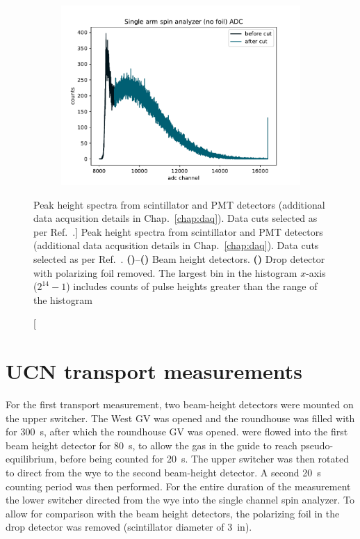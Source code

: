 \begin{figure}
\begin{subfigure}{.5\textwidth}
  \includegraphics[width=\textwidth]{figures/2021_single_arm_no_foil_adc.pdf}
  \caption{}\label{subfig:single_arm_no_foil_adc}
\end{subfigure}
\caption
[Peak height spectra from \BZnS scintillator and PMT detectors (additional data acqusition details in Chap.~\ref{chap:daq}).  Data cuts selected as per Ref.~\cite{jeph_multilayer_2015}.]
{Peak height spectra from \BZnS scintillator and PMT detectors (additional data acqusition details in Chap.~\ref{chap:daq}). Data cuts selected as per Ref.~\cite{jeph_multilayer_2015}. \textbf{()}--\textbf{()} Beam height detectors. \textbf{()} Drop detector with polarizing foil removed. The largest bin in the histogram $x$-axis ($2^{14}-1$) includes counts of pulse heights greater than the range of the histogram}
\label{fig:2021_detector_adc}
\end{figure}


\section{UCN transport measurements}\label{sec:2021_ucn_transport_switchers}


For the first \ucn transport measurement, two beam-height detectors were mounted on the upper switcher. The West GV was opened and the roundhouse was filled with \ucn for \qty{300}{s}, after which the roundhouse GV was opened. \ucn were flowed into the first beam height detector for \qty{80}{s}, to allow the \ucn gas in the guide to reach pseudo-equilibrium, before being counted for \qty{20}{s}. The upper switcher was then rotated to direct \ucn from the wye to the second beam-height detector. A second \qty{20}{s} counting period was then performed. For the entire duration of the measurement the lower switcher directed \ucn from the wye into the single channel spin analyzer. To allow for comparison with the beam height detectors, the polarizing foil in the drop detector was removed (\BZnS scintillator diameter of \qty{3}{in}).

